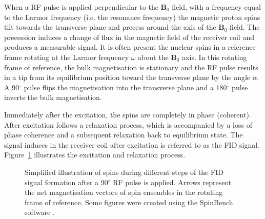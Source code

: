 When a \gls{RF} pulse is applied perpendicular to the $\mathbf{B}_0$ field, with a frequency equal to the Larmor frequency (i.e. the resonance frequency) the magnetic proton spins tilt towards the transverse plane and precess around the axis of the $\mathbf{B}_0$ field. The precession induces a change of flux in the magnetic field of the receiver coil and produces a measurable signal. It is often present the nuclear spins in a reference frame rotating at the Larmor frequency $\omega$ about the $\mathbf{B}_0$ axis. In this rotating frame of reference, the bulk magnetisation is stationary and the \gls{RF} pulse results in a tip from its equilibrium position toward the transverse plane by the angle $\alpha$. A 90$^\circ$ pulse flips the magnetisation into the transverse plane and a 180$^\circ$ pulse inverts the bulk magnetisation.

Immediately after the excitation, the spins are completely in phase (coherent). After excitation follows a relaxation process, which is accompanied by a loss of phase coherence and a subsequent relaxation back to equilibrium state. The signal induces in the receiver coil after excitation is referred to as the \gls{FID} signal. Figure~\ref{fig:chapter2 spin FIDs} illustrates the excitation and relaxation process. 

\begin{figure}[H]
\centering
{}
\caption{Simplified illustration of spins during different steps of the FID signal formation after a 90$^\circ$ RF pulse is applied. Arrows represent the net magnetisation vectors of spin ensembles in the rotating frame of reference. Some figures were created using the SpinBench software \citep{Overall:2007}.}
\label{fig:chapter2 spin FIDs}
\end{figure}

